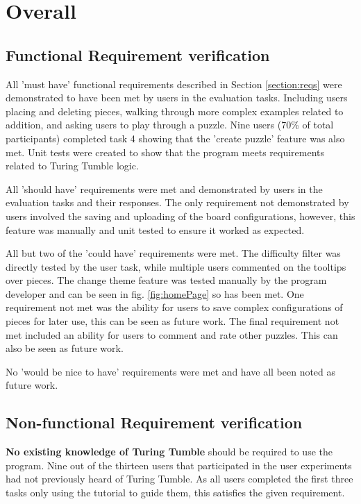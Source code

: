 \documentclass{l4proj}
\begin{document}
\section{Overall}
\subsection{Functional Requirement verification}

All 'must have' functional requirements described in Section \ref{section:reqs} were demonstrated to have been met by users in the evaluation tasks. Including users placing and deleting pieces, walking through more complex examples related to addition, and asking users to play through a puzzle. Nine users (70\% of total participants) completed task 4 showing that the 'create puzzle' feature was also met. Unit tests were created to show that the program meets requirements related to Turing Tumble logic.

All 'should have' requirements were met and demonstrated by users in the evaluation tasks and their responses. The only requirement not demonstrated by users involved the saving and uploading of the board configurations, however, this feature was manually and unit tested to ensure it worked as expected. 

All but two of the 'could have' requirements were met. The difficulty filter was directly tested by the user task, while multiple users commented on the tooltips over pieces. The change theme feature was tested manually by the program developer and can be seen in fig. \ref{fig:homePage} so has been met. One requirement not met was the ability for users to save complex configurations of pieces for later use, this can be seen as future work. The final requirement not met included an ability for users to comment and rate other puzzles. This can also be seen as future work. 

No 'would be nice to have' requirements were met and have all been noted as future work.

\subsection{Non-functional Requirement verification}
\textbf{No existing knowledge of Turing Tumble} should be required to use the program. Nine out of the thirteen users that participated in the user experiments had not previously heard of Turing Tumble. As all users completed the first three tasks only using the tutorial to guide them, this satisfies the given requirement.
\end{document}
